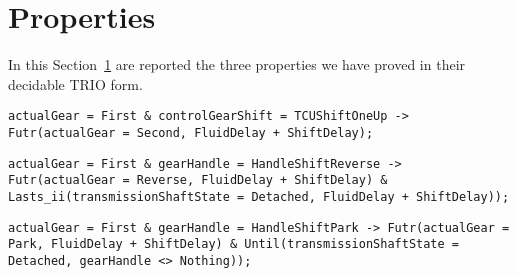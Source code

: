\section{Properties}
\label{Section:Properties}
In this Section~\ref{Section:Properties} are reported the three properties we have proved in their decidable TRIO form.

\begin{lstlisting}[language=TRIO,basicstyle=\small,breaklines,breakatwhitespace,frame=single,caption=Property 1,label=Code:Property1]
actualGear = First & controlGearShift = TCUShiftOneUp -> Futr(actualGear = Second, FluidDelay + ShiftDelay);
\end{lstlisting}

\begin{lstlisting}[language=TRIO,basicstyle=\small,breaklines,breakatwhitespace,frame=single,caption=Property 2,label=Code:Property2]
actualGear = First & gearHandle = HandleShiftReverse -> Futr(actualGear = Reverse, FluidDelay + ShiftDelay) & Lasts_ii(transmissionShaftState = Detached, FluidDelay + ShiftDelay));
\end{lstlisting}

\begin{lstlisting}[language=TRIO,basicstyle=\small,breaklines,breakatwhitespace,frame=single,caption=Property 3,label=Code:Property3]
actualGear = First & gearHandle = HandleShiftPark -> Futr(actualGear = Park, FluidDelay + ShiftDelay) & Until(transmissionShaftState = Detached, gearHandle <> Nothing));
\end{lstlisting}
